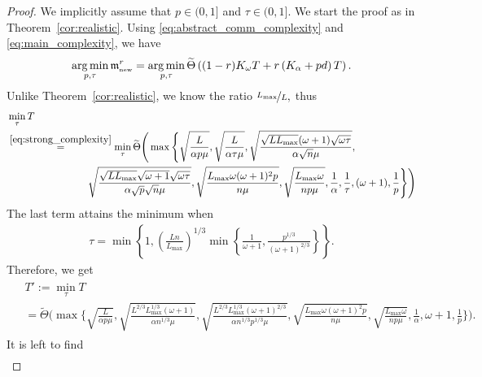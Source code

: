 \documentclass{article} %
\theoremstyle{plain}
\theoremstyle{definition}
\theoremstyle{remark}
\newcommand{\eqdef}{:=}
\DeclareMathOperator*{\argmin}{arg\,min}%
\begin{document}
\COROLLARYMAINSTRONG*

\begin{proof}
  We implicitly assume that $p \in (0, 1]$ and $\tau \in (0, 1].$ We start the proof as in Theorem~\ref{cor:realistic}. Using \eqref{eq:abstract_comm_complexity} and \eqref{eq:main_complexity}, we have
    \begin{align*}
      \argmin_{p, \tau} \mathfrak{m}^{r}_{{\scriptscriptstyle \textnormal{new}}} = \argmin_{p, \tau} \widetilde{\Theta} \left((1 - r)K_{\omega} T + r \left(K_{\alpha} + p d\right) T\right).
    \end{align*}
  Unlike Theorem~\ref{cor:realistic}, we know the ratio $\nicefrac{L_{\max}}{L},$ thus
  \begin{align*}
    &\min_{\tau} T \\
    &\overset{\eqref{eq:strong_complexity}}{=} \min_{\tau} \widetilde{\Theta}\Bigg(\max\Bigg\{\sqrt{\frac{L}{\alpha p \mu}},\sqrt{\frac{L}{\alpha \tau \mu}},\sqrt{\frac{\sqrt{L L_{\max}} (\omega + 1) \sqrt{\omega \tau}}{\alpha \sqrt{n} \mu}},\\
    & \qquad\quad \qquad \qquad \quad \sqrt{\frac{\sqrt{L L_{\max}} \sqrt{\omega + 1} \sqrt{\omega \tau}}{\alpha \sqrt{p} \sqrt{n} \mu}},\sqrt{\frac{L_{\max} \omega (\omega + 1)^2 p}{n \mu}}, \sqrt{\frac{L_{\max} \omega}{n p \mu}}, \frac{1}{\alpha}, \frac{1}{\tau}, (\omega + 1), \frac{1}{p}\Bigg\}\Bigg)
  \end{align*}
  The last term attains the minimum when 
  \begin{align}
  \label{eq:opt_tau_know}
  \tau = \min\left\{1, \left(\frac{L n}{L_{\max}}\right)^{1/3} \min\left\{\frac{1}{\omega + 1}, \frac{p^{1/3}}{(\omega + 1)^{2/3}}\right\}\right\}.
  \end{align}
  Therefore, we get
    \begin{eqnarray}
    \begin{aligned}
      \label{eq:t_prime_know}
      &T' \eqdef \min_{\tau} T \\
      &= \widetilde{\Theta}\Bigg(\max\Bigg\{\sqrt{\frac{L}{\alpha p \mu}},\sqrt{\frac{L^{2/3} L_{\max}^{1/3} (\omega + 1)}{\alpha n^{1/3} \mu}}, \sqrt{\frac{L^{2/3} L_{\max}^{1/3} (\omega + 1)^{2/3}}{\alpha n^{1/3} p^{1/3} \mu}}, \sqrt{\frac{L_{\max} \omega (\omega + 1)^2 p}{n \mu}}, \sqrt{\frac{L_{\max} \omega}{n p \mu}}, \frac{1}{\alpha}, \omega + 1, \frac{1}{p}\Bigg\}\Bigg).
    \end{aligned}
    \end{eqnarray}
  It is left to find 
  \begin{align}

\end{align}
\end{proof}
\end{document}
